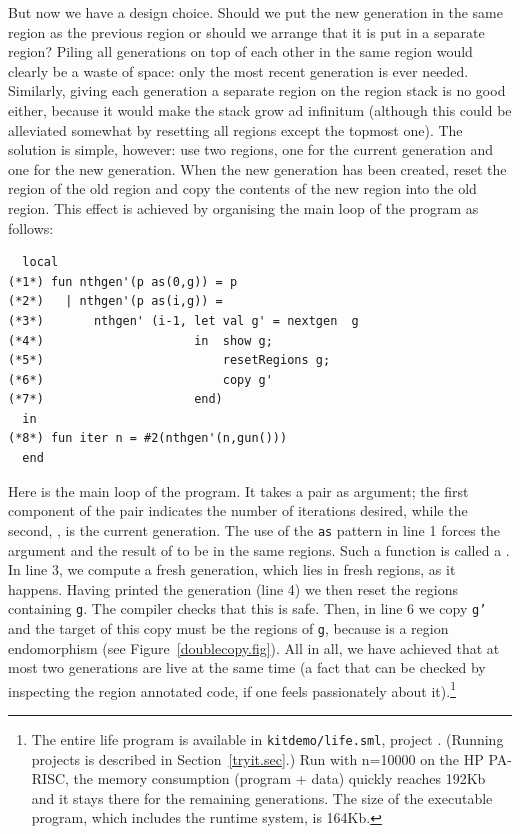 \documentclass[12pt]{book}
\begin{document}
But now we have a design choice. Should we put the new generation in
the same region as the previous region or should we arrange that it is
put in a separate region? Piling all generations on top of each
other in the same region
would clearly be a waste of space: only the most recent generation is
ever needed. Similarly, giving each generation a separate region on the
region stack is no good either, because it would make the stack grow
ad infinitum (although this could be alleviated somewhat by resetting
all regions except the topmost one). The solution is simple, however:
use two regions, one for the current generation and one for the new
generation. When the new generation has been created, reset the region
of the old region and copy the contents of 
the new region into the old region. This effect is
achieved by organising the main loop of the program as follows:
\begin{verbatim}
  local 
(*1*) fun nthgen'(p as(0,g)) = p 
(*2*)   | nthgen'(p as(i,g)) = 
(*3*)       nthgen' (i-1, let val g' = nextgen  g
(*4*)                     in  show g;
(*5*)                         resetRegions g;
(*6*)                         copy g'
(*7*)                     end)
  in 
(*8*) fun iter n = #2(nthgen'(n,gun()))
  end
\end{verbatim}
Here  is the main loop of the program. It takes a pair as
argument; the first component of the pair indicates the number of iterations
desired, while the second, , is the current generation. The use of
the {\tt as} pattern in line 1 forces the argument and the result of 
 to be in the same regions. Such a function is called
a . In line 3, we compute a fresh
generation, which lies in fresh regions, as it happens. Having printed the
generation (line 4) we then reset the regions containing {\tt g}. The
compiler checks that this is safe. Then, in line 6 we copy {\tt g'} and
the target of this copy must be the regions of {\tt g}, 
because  is a region endomorphism (see Figure~\ref{doublecopy.fig}). 
All in all, we have achieved
that at most two generations are live at the same time (a fact that can
be checked by inspecting the region annotated code, if one feels 
passionately about it).\footnote{The entire life program is available in
{\tt kitdemo/life.sml}, project . (Running projects is
described in Section~\ref{tryit.sec}.) Run with n=10000 on the HP PA-RISC, 
the memory consumption (program + data) 
quickly reaches 192Kb and it stays there for the
remaining generations. The size of the executable program, which
includes the runtime system, is 164Kb.} 
\end{document}
